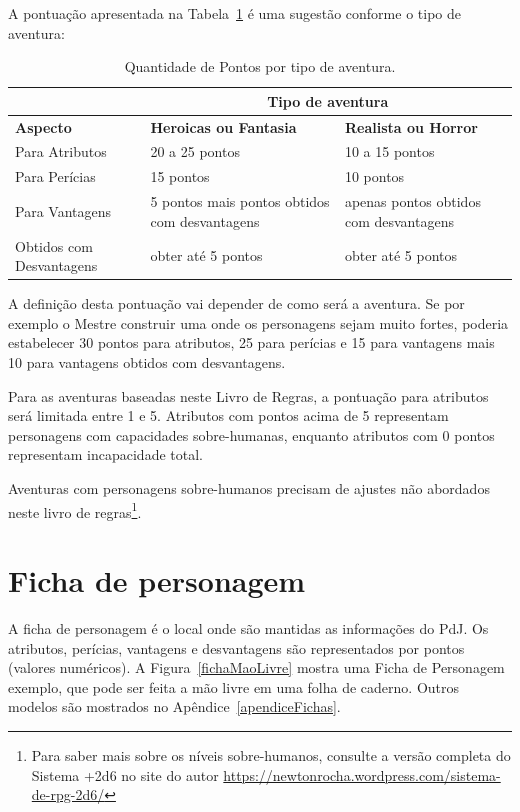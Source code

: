 A pontuação apresentada na Tabela~\ref{tblPtos} é uma sugestão conforme o tipo de aventura:

\begin{table}[htb]
	\centering\smaller
	\caption{Quantidade de Pontos por tipo de aventura.}
	\begin{tabularx}{\textwidth}{|X|X|X|}
		\hline
		&	\multicolumn{2}{c|}{\textbf{Tipo de aventura}} \\
		\hline
		\textbf{Aspecto}	&	\textbf{Heroicas ou Fantasia} &	\textbf{Realista ou Horror} \\
		\hline
		Para Atributos		& 20 a 25 pontos  	& 10 a 15 pontos	\\
		\hline
		Para Perícias		& 15 pontos  				& 10 pontos\\
		\hline
		Para Vantagens		& 5 pontos mais pontos obtidos com desvantagens 				& apenas pontos obtidos com desvantagens \\
		\hline
		Obtidos com Desvantagens	& obter até 5 pontos  	& obter até 5 pontos \\
		\hline
	\end{tabularx}
	\label{tblPtos}
\end{table}

A definição desta pontuação vai depender de como será a aventura. Se por exemplo o Mestre construir uma onde os personagens sejam muito fortes, poderia estabelecer 30 pontos para atributos, 25 para perícias e 15 para vantagens mais 10 para vantagens obtidos com desvantagens.

Para as aventuras baseadas neste Livro de Regras, a pontuação para atributos será limitada entre 1 e 5. Atributos com pontos acima de 5 representam personagens com capacidades sobre-humanas, enquanto atributos com 0 pontos representam incapacidade total. 

Aventuras com personagens sobre-humanos precisam de ajustes não abordados neste livro de regras\footnote{Para saber mais sobre os níveis sobre-humanos, consulte a versão completa do Sistema +2d6 no site do autor \url{https://newtonrocha.wordpress.com/sistema-de-rpg-2d6/}}. 

\section{\label{sec:fichaPdj}Ficha de personagem}
A ficha de personagem é o local onde são mantidas as informações do PdJ. Os atributos, perícias, vantagens e desvantagens são representados por pontos (valores numéricos). A Figura~\ref{fichaMaoLivre} mostra uma Ficha de Personagem exemplo, que pode ser feita a mão livre em uma folha de caderno. Outros modelos são mostrados no Apêndice~\ref{apendiceFichas}.

